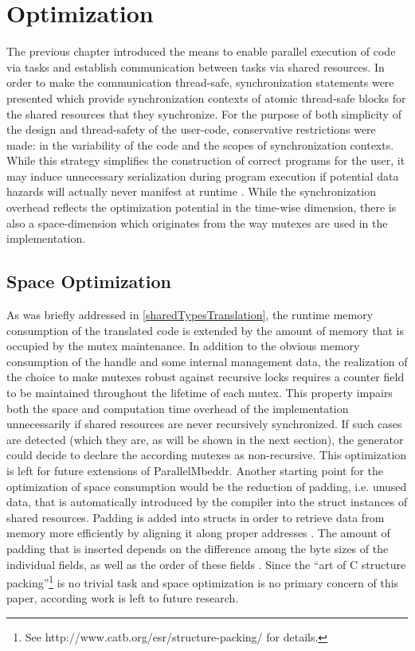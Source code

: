 \chapter{Optimization}
\label{optimization}
The previous chapter introduced the means to enable parallel execution of code via tasks and establish communication between tasks via shared resources. In order to make the communication thread-safe, synchronization statements were presented which provide synchronization contexts of atomic thread-safe blocks for the shared resources that they synchronize. For the purpose of both simplicity of the design and thread-safety of the user-code, conservative restrictions were made: in the variability of the code and the scopes of synchronization contexts. While this strategy simplifies the construction of correct programs for the user, it may induce unnecessary serialization during program execution if potential data hazards will actually never manifest at runtime \cite{SpeculativeLockElision}. While the synchronization overhead reflects the optimization potential in the time-wise dimension, there is also a space-dimension which originates from the way mutexes are used in the implementation. 

\section{Space Optimization}
As was briefly addressed in \ref{sharedTypesTranslation}, the runtime memory consumption of the translated code is extended by the amount of memory that is occupied by the mutex maintenance. In addition to the obvious memory consumption of the handle and some internal management data, the realization of the choice to make mutexes robust against recursive locks requires a counter field to be maintained throughout the lifetime of each mutex. This property impairs both the space and computation time overhead of the implementation unnecessarily if shared resources are never recursively synchronized. If such cases are detected (which they are, as will be shown in the next section), the generator could decide to declare the according mutexes as non-recursive. This optimization is left for future extensions of ParallelMbeddr. Another starting point for the optimization of space consumption would be the reduction of padding, i.e. unused data, that is automatically introduced by the compiler into the struct instances of shared resources. Padding is added into structs in order to retrieve data from memory more efficiently by aligning it along proper addresses \cite[p.~27]{MemoryAsAProgrammingConcept}. The amount of padding that is inserted depends on the difference among the byte sizes of the individual fields, as well as the order of these fields \cite{MemoryAsAProgrammingConcept}. Since the ``art of C structure packing''\footnote{See http://www.catb.org/esr/structure-packing/ for details.} is no trivial task and space optimization is no primary concern of this paper, according work is left to future research.



